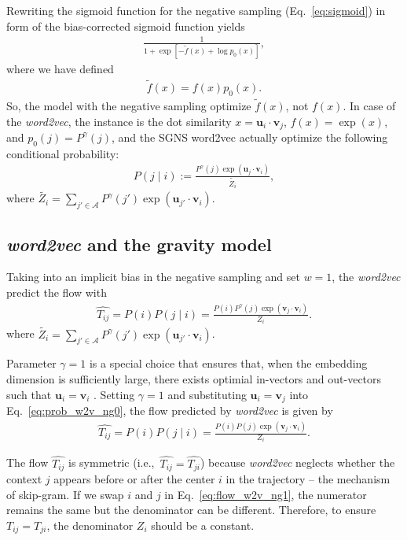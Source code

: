 \documentclass[12pt,a4paper]{article}
\def\given{\mid}
\def\ie{i.e.,~}
\begin{document}
Rewriting the sigmoid function for the negative sampling (Eq.~\eqref{eq:sigmoid}) in form of the bias-corrected sigmoid function yields
\begin{align}
	\label{eq:sigmoid3}
	\frac{1}{1 + \exp\left[ - \tilde f(x) + \log p_0(x)  \right]},
\end{align}
where we have defined
\begin{align}
	\label{eq:unnormalized}
	\tilde f(x) = f(x) p_0(x).
\end{align}
So, the model with the negative sampling optimize $\tilde f(x)$, not $f(x)$. In case of the {\it word2vec}, the instance is the dot similarity $x=\bm{u}_i \cdot \bm{v}_j$,  $f(x)=\exp(x)$, and $p_0(j)=P^\gamma(j)$, and the SGNS word2vec actually optimize the following conditional probability:
\begin{align}
	P\left(j \given i \right):= \frac{P^\gamma (j)\exp(\bm{u}_j \cdot \bm{v}_{i})}{\widetilde{Z_i}},
	\label{eq:real_cond}
\end{align}
where $\widetilde {Z_i}=\sum_{j' \in \mathcal{A}} P^\gamma (j') \exp(\bm{u}_{j'} \cdot \bm{v}_{i})$.


\subsection{\textit{word2vec} and the gravity model}

Taking into an implicit bias in the negative sampling  and set $w=1$, the \textit{word2vec} predict the flow with
\begin{align}
\hat{T_{ij}}= P(i) P(j\given i) = \frac{P(i)P^\gamma (j)\exp(\bm{v}_j \cdot \bm{v}_{i})}{Z_i}. \label{eq:prob_w2v_ng0}
\end{align}
where  $\widetilde{Z_i}=\sum_{j' \in \mathcal{A}} P^ \gamma (j') \exp(\bm{u}_{j'} \cdot \bm{v}_{i})$. 

Parameter $\gamma=1$ is a special choice that ensures that, when the embedding dimension is sufficiently large, there exists optimial in-vectors and out-vectors such that $\bm{u}_i = \bm{v}_i$ \autocite{levy2014neural}.
Setting $\gamma = 1$ and substituting $\bm{u}_i = \bm{v}_j$ into Eq.~\eqref{eq:prob_w2v_ng0}, the flow predicted by {\it word2vec} is given by
\begin{align}
	\hat{T_{ij}}= P(i) P(j\given i) = \frac{P(i)P(j)\exp(\bm{v}_j \cdot \bm{v}_{i})}{Z_i}. \label{eq:flow_w2v_ng1}
\end{align}

The flow $\hat{T_{ij}}$ is symmetric (\ie $\hat{T_{ij}}=\hat{T_{ji}}$) because {\it word2vec} neglects whether the context $j$ appears before or after the center $i$ in the trajectory -- the mechanism of skip-gram.
If we swap $i$ and $j$ in Eq.~\eqref{eq:flow_w2v_ng1}, the numerator remains the same but the denominator can be different.
Therefore, to ensure $T_{ij} = T_{ji}$, the denominator $Z_i$ should be a constant.
\end{document}
